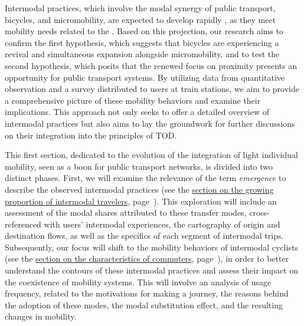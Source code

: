\begin{refsegment}
Intermodal practices, which involve the modal synergy of public transport, bicycles, and micromobility, are expected to develop rapidly \textcolor{blue}{\autocite[4]{kostrzewska_towards_2017}}, as they meet mobility needs related to the  \textcolor{blue}{\autocite[29]{holm_moller_micromobility_2020}}. Based on this projection, our research aims to confirm the first hypothesis, which suggests that bicycles are experiencing a revival and simultaneous expansion alongside micromobility, and to test the second hypothesis, which posits that the renewed focus on proximity presents an opportunity for public transport systems. By utilizing data from quantitative observation and a survey distributed to users at train stations, we aim to provide a comprehensive picture of these mobility behaviors and examine their implications. This approach not only seeks to offer a detailed overview of intermodal practices but also aims to lay the groundwork for further discussions on their integration into the principles of \acrfull{TOD}.%

This first section, dedicated to the evolution of the integration of light individual mobility, seen as a boon for public transport networks, is divided into two distinct phases. First, we will examine the relevance of the term \textsl{emergence} to describe the observed intermodal practices (see the \hyperref[chap4:proportion-croissante-voyageurs-intermodaux]{section on the growing proportion of intermodal travelers}, page~\pageref{chap4:proportion-croissante-voyageurs-intermodaux}). This exploration will include an assessment of the modal shares attributed to these transfer modes, cross-referenced with users' intermodal experiences, the \gls{cartography} of origin and destination flows, as well as the specifics of each segment of intermodal trips. Subsequently, our focus will shift to the mobility behaviors of intermodal cyclists (see the \hyperref[chap4:comportements-mobilite]{section on the characteristics of commuters}, page~\pageref{chap4:comportements-mobilite}), in order to better understand the contours of these intermodal practices and assess their impact on the coexistence of mobility systems. This will involve an analysis of usage frequency, related to the motivations for making a \gls{journey}, the reasons behind the adoption of these modes, the modal substitution effect, and the resulting changes in mobility.%


\end{refsegment}
